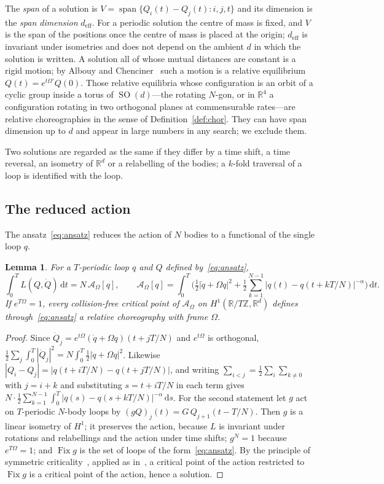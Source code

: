 \documentclass[11pt]{amsart}
\newtheorem{lemma}[theorem]{Lemma}
\theoremstyle{definition}
\newcommand{\R}{\mathbb{R}}
\newcommand{\Z}{\mathbb{Z}}
\newcommand{\act}{\mathcal{A}}
\newcommand{\dd}{\,\mathrm{d}}
\newcommand{\deff}{d_{\mathrm{eff}}}
\DeclareMathOperator{\spn}{span}
\DeclareMathOperator{\SO}{SO}
\DeclareMathOperator{\Fix}{Fix}
\begin{document}
The \emph{span} of a solution is $V=\spn\{Q_i(t)-Q_j(t): i,j,t\}$ and its dimension is the \emph{span dimension} $\deff$. For a periodic solution the centre of mass is fixed, and $V$ is the span of the positions once the centre of mass is placed at the origin; $\deff$ is invariant under isometries and does not depend on the ambient $d$ in which the solution is written. A solution all of whose mutual distances are constant is a rigid motion; by Albouy and Chenciner~\cite{AlbouyChenciner1998} such a motion is a relative equilibrium $Q(t)=e^{t\Omega'}Q(0)$. Those relative equilibria whose configuration is an orbit of a cyclic group inside a torus of $\SO(d)$---the rotating $N$-gon, or in $\R^4$ a configuration rotating in two orthogonal planes at commensurable rates---are relative choreographies in the sense of Definition~\ref{def:chor}. They can have span dimension up to $d$ and appear in large numbers in any search; we exclude them.

Two solutions are regarded as the same if they differ by a time shift, a time reversal, an isometry of $\R^d$ or a relabelling of the bodies; a $k$-fold traversal of a loop is identified with the loop.

\subsection{The reduced action}
The ansatz~\eqref{eq:ansatz} reduces the action of $N$ bodies to a functional of the single loop $q$.

\begin{lemma}\label{lem:reduced}
For a $T$-periodic loop $q$ and $Q$ defined by~\eqref{eq:ansatz},
\[
\int_0^T L(Q,\dot Q)\dd t=N\,\act_\Omega[q],\qquad
\act_\Omega[q]=\int_0^T\Big(\tfrac12|\dot q+\Omega q|^2+\tfrac12\sum_{k=1}^{N-1}\big|q(t)-q(t+kT/N)\big|^{-\alpha}\Big)\dd t.
\]
If $e^{T\Omega}=1$, every collision-free critical point of $\act_\Omega$ on $H^1(\R/T\Z,\R^d)$ defines through~\eqref{eq:ansatz} a relative choreography with frame $\Omega$.
\end{lemma}

\begin{proof}
Since $\dot Q_j=e^{t\Omega}(\dot q+\Omega q)(t+jT/N)$ and $e^{t\Omega}$ is orthogonal, $\frac12\sum_j\int_0^T|\dot Q_j|^2=N\int_0^T\frac12|\dot q+\Omega q|^2$. Likewise $|Q_i-Q_j|=|q(t+iT/N)-q(t+jT/N)|$, and writing $\sum_{i<j}=\frac12\sum_i\sum_{k\ne0}$ with $j=i+k$ and substituting $s=t+iT/N$ in each term gives $N\cdot\frac12\sum_{k=1}^{N-1}\int_0^T|q(s)-q(s+kT/N)|^{-\alpha}\dd s$. For the second statement let $g$ act on $T$-periodic $N$-body loops by $(gQ)_j(t)=G\,Q_{j+1}(t-T/N)$. Then $g$ is a linear isometry of $H^1$; it preserves the action, because $L$ is invariant under rotations and relabellings and the action under time shifts; $g^N=1$ because $e^{T\Omega}=1$; and $\Fix g$ is the set of loops of the form~\eqref{eq:ansatz}. By the principle of symmetric criticality~\cite{Palais1979}, applied as in~\cite{FerrarioTerracini2004}, a critical point of the action restricted to $\Fix g$ is a critical point of the action, hence a solution.
\end{proof}
\end{document}
